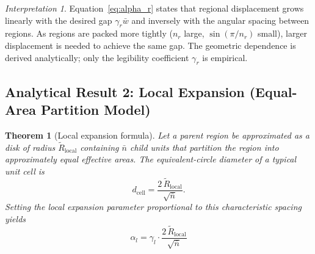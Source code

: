 \documentclass[12pt, a4paper]{article}
\numberwithin{equation}{section}
\theoremstyle{definition}
\theoremstyle{plain}
\newtheorem{theorem}{Theorem}[section]
\theoremstyle{remark}
\newtheorem*{interpretation}{Interpretation}
\begin{document}
\begin{interpretation}
Equation~\eqref{eq:alpha_r} states that regional displacement grows linearly with the desired gap $\gamma_r\bar{w}$ and inversely with the angular spacing between regions. As regions are packed more tightly ($n_r$ large, $\sin(\pi/n_r)$ small), larger displacement is needed to achieve the same gap. The geometric dependence is derived analytically; only the legibility coefficient $\gamma_r$ is empirical.
\end{interpretation}


\subsection{Analytical Result 2: Local Expansion (Equal-Area Partition Model)}

\begin{theorem}[Local expansion formula]
\label{thm:alpha_l}
Let a parent region be approximated as a disk of radius $\widetilde{R}_{\text{local}}$ containing $\bar{n}$ child units that partition the region into approximately equal effective areas. The equivalent-circle diameter of a typical unit cell is
\begin{equation}
  d_{\text{cell}} = \frac{2\,\widetilde{R}_{\text{local}}}{\sqrt{\bar{n}}}.
  \label{eq:dcell}
\end{equation}
Setting the local expansion parameter proportional to this characteristic spacing yields
\begin{equation}
  \boxed{\alpha_l = \gamma_l \cdot \frac{2\,\widetilde{R}_{\text{local}}}{\sqrt{\bar{n}}}}
  \label{eq:alpha_l}
\end{equation}
\end{theorem}
\end{document}
